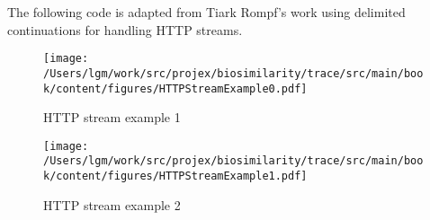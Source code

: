 The following code is adapted from Tiark Rompf's work using delimited
continuations for handling HTTP streams.

\begin{figure}[tbp]
\begin{center}
{ \texttt{[image: /Users/lgm/work/src/projex/biosimilarity/trace/src/main/book/content/figures/HTTPStreamExample0.pdf]} }
\caption{ HTTP stream example 1 }
\end{center}
\end{figure}

\begin{figure}[tbp]
\begin{center}
{ \texttt{[image: /Users/lgm/work/src/projex/biosimilarity/trace/src/main/book/content/figures/HTTPStreamExample1.pdf]} }
\caption{ HTTP stream example 2 }
\end{center}
\end{figure}